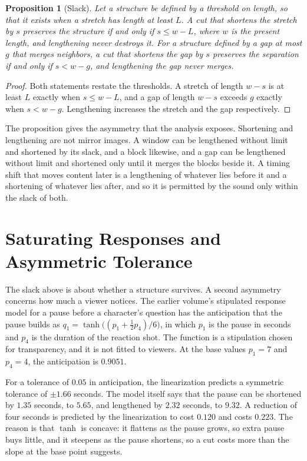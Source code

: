 \documentclass[11pt,twoside,openright]{book}
\theoremstyle{plain}
\newtheorem{proposition}[theorem]{Proposition}
\theoremstyle{definition}
\theoremstyle{remark}
\begin{document}
\begin{proposition}[Slack]\label{prop:slack}
Let a structure be defined by a threshold on length, so that it exists when a stretch has length at least $L$. A cut that shortens the stretch by $s$ preserves the structure if and only if $s\le w-L$, where $w$ is the present length, and lengthening never destroys it. For a structure defined by a gap at most $g$ that merges neighbors, a cut that shortens the gap by $s$ preserves the separation if and only if $s<w-g$, and lengthening the gap never merges.
\end{proposition}

\begin{proof}
Both statements restate the thresholds. A stretch of length $w-s$ is at least $L$ exactly when $s\le w-L$, and a gap of length $w-s$ exceeds $g$ exactly when $s<w-g$. Lengthening increases the stretch and the gap respectively.
\end{proof}

The proposition gives the asymmetry that the analysis exposes. Shortening and lengthening are not mirror images. A window can be lengthened without limit and shortened by its slack, and a block likewise, and a gap can be lengthened without limit and shortened only until it merges the blocks beside it. A timing shift that moves content later is a lengthening of whatever lies before it and a shortening of whatever lies after, and so it is permitted by the sound only within the slack of both.

\section{Saturating Responses and Asymmetric Tolerance}\label{sec:saturating}

The slack above is about whether a structure survives. A second asymmetry concerns how much a viewer notices. The earlier volume's stipulated response model for a pause before a character's question has the anticipation that the pause builds as $q_1=\tanh\bigl((p_1+\tfrac12p_4)/6\bigr)$, in which $p_1$ is the pause in seconds and $p_4$ is the duration of the reaction shot. The function is a stipulation chosen for transparency, and it is not fitted to viewers. At the base values $p_1=7$ and $p_4=4$, the anticipation is $0.9051$.

For a tolerance of $0.05$ in anticipation, the linearization predicts a symmetric tolerance of $\pm1.66$ seconds. The model itself says that the pause can be shortened by $1.35$ seconds, to $5.65$, and lengthened by $2.32$ seconds, to $9.32$. A reduction of four seconds is predicted by the linearization to cost $0.120$ and costs $0.223$. The reason is that $\tanh$ is concave: it flattens as the pause grows, so extra pause buys little, and it steepens as the pause shortens, so a cut costs more than the slope at the base point suggests.
\end{document}
